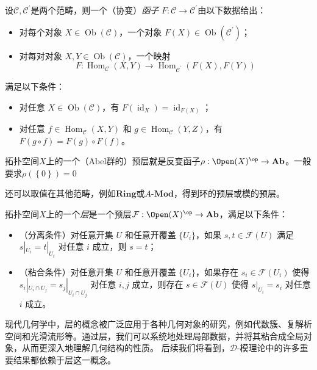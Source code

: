 \begin{definition}
    设$\mathcal{C},\mathcal{C}^\prime$是两个范畴，则一个（协变）\emph{函子} $F:\mathcal{C}\to \mathcal{C}^\prime$由以下数据给出：

    \begin{itemize}
        \item
              对每个对象 $X\in \operatorname{Ob}(\mathcal{C})$，一个对象 $F(X)\in \operatorname{Ob}(\mathcal{C}^\prime)$；
        \item
              对每对对象 $X,Y\in \operatorname{Ob}(\mathcal{C})$，一个映射
              \[
                  F:\operatorname{Hom}_{\mathcal{C}}(X,Y)\to \operatorname{Hom}_{\mathcal{C}^\prime}(F(X),F(Y))
              \]
    \end{itemize}
    满足以下条件：
    \begin{itemize}
        \item 对任意 $X\in \operatorname{Ob}(\mathcal{C})$，有 $F(\operatorname{id}_X)=\operatorname{id}_{F(X)}$；
        \item 对任意 $f\in \operatorname{Hom}_{\mathcal{C}}(X,Y)$ 和 $g\in \operatorname{Hom}_{\mathcal{C}}(Y,Z)$，有 $F(g\circ f)=F(g)\circ F(f)$。
    \end{itemize}
\end{definition}

\begin{example}
    拓扑空间$X$上的一个（Abel群的）预层就是反变函子$\rho :\Open(X)^{\op} \to \mathbf{Ab}$。一般要求$\rho(\left\{0\right\})=0$
\end{example}
\begin{remark}
    还可以取值在其他范畴，例如$\mathbf{Ring}$或$A\text{-}\mathbf{Mod}$，得到环的预层或模的预层。
\end{remark}

\begin{definition}
    拓扑空间$X$上的一个\emph{层}是一个预层$\mathcal{F}:\Open(X)^{\op}\to \mathbf{Ab}$，满足以下条件：
    \begin{itemize}
        \item
              （分离条件）对任意开集 $U$ 和任意开覆盖 $\{U_i\}$，如果 $s,t\in \mathcal{F}(U)$ 满足 $s|_{U_i}=t|_{U_i}$ 对任意 $i$ 成立，则 $s=t$；

        \item
              （粘合条件）对任意开集 $U$ 和任意开覆盖 $\{U_i\}$，如果存在 $s_i\in \mathcal{F}(U_i)$ 使得 $s_i|_{U_i\cap U_j}=s_j|_{U_i\cap U_j}$ 对任意 $i,j$ 成立，则存在 $s\in \mathcal{F}(U)$ 使得 $s|_{U_i}=s_i$ 对任意 $i$ 成立。
    \end{itemize}
\end{definition}
现代几何学中，层的概念被广泛应用于各种几何对象的研究，例如代数簇、复解析空间和光滑流形等。通过层，我们可以系统地处理局部数据，并将其粘合成全局对象，从而更深入地理解几何结构的性质。
后续我们将看到，$\mathcal{D}$-模理论中的许多重要结果都依赖于层这一概念。

